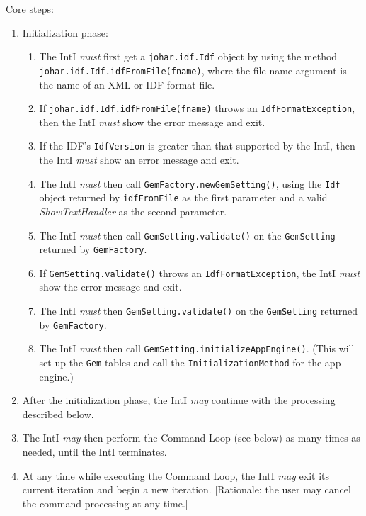 \documentclass[11pt]{article}
\newcommand{\must}{{\it must}}
\newcommand{\may}{{\it may}}
\newcounter{coreReq}
\begin{document}
\noindent
Core steps:
\begin{enumerate}
\setcounter{enumi}{\value{coreReq}}
\item Initialization phase:
  \begin{enumerate}
  \item The IntI {\must} first get a {\tt johar.idf.Idf} object by using the
    method {\tt johar.idf.Idf.idfFromFile(fname)}, where the file name
    argument is the name of an XML or IDF-format file.
  \item If {\tt johar.idf.Idf.idfFromFile(fname)} throws an
    {\tt IdfFormatException}, then the IntI {\must} show the error message
    and exit.
  \item If the IDF's {\tt IdfVersion} is greater than that supported
    by the IntI, then the IntI {\must} show an error message
    and exit.
  \item The IntI {\must} then call {\tt GemFactory.newGemSetting()},
    using the {\tt Idf} object returned by {\tt idfFromFile} as the
    first parameter and a valid {\it ShowTextHandler} as the second
    parameter.
  \item The IntI {\must} then call {\tt GemSetting.validate()} on the
    {\tt GemSetting} returned by {\tt GemFactory}.
  \item If {\tt GemSetting.validate()} throws an
    {\tt IdfFormatException}, the IntI {\must} show the error message
    and exit.
  \item The IntI {\must} then  {\tt GemSetting.validate()} on the
    {\tt GemSetting} returned by {\tt GemFactory}.
  \item The IntI {\must} then call {\tt GemSetting.initializeAppEngine()}.
    (This will set up the {\tt Gem} tables and call the
    {\tt InitializationMethod} for the app engine.)
  \end{enumerate}
\item After the initialization phase, the IntI {\may}
  continue with the processing described below.
\item The IntI {\may} then perform the Command Loop
  (see below) as many times as needed, until the IntI terminates.
\item At any time while executing the Command Loop, the IntI
  {\may} exit its current iteration and begin a new iteration.
  [Rationale: the user may cancel the command processing at any time.]
\setcounter{coreReq}{\value{enumi}}
\end{enumerate}
\end{document}
